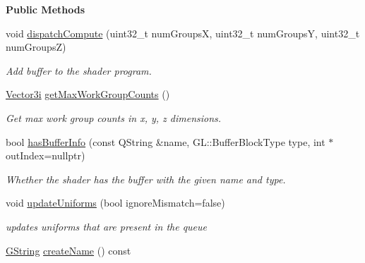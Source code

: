 \begin{Indent}\textbf{ Public Methods}\par
\begin{DoxyCompactItemize}
\item 
void \mbox{\hyperlink{classrev_1_1_shader_program_aa7b7f1acfd59f0fdb168c2643d8654c2}{dispatch\+Compute}} (uint32\+\_\+t num\+GroupsX, uint32\+\_\+t num\+GroupsY, uint32\+\_\+t num\+GroupsZ)
\begin{DoxyCompactList}\small\item\em Add buffer to the shader program. \end{DoxyCompactList}\item 
\mbox{\label{classrev_1_1_shader_program_a93bdc31db991a99df89ce30cd7a11c8b}} 
\mbox{\hyperlink{classrev_1_1_vector}{Vector3i}} \mbox{\hyperlink{classrev_1_1_shader_program_a93bdc31db991a99df89ce30cd7a11c8b}{get\+Max\+Work\+Group\+Counts}} ()
\begin{DoxyCompactList}\small\item\em Get max work group counts in x, y, z dimensions. \end{DoxyCompactList}\item 
\mbox{\label{classrev_1_1_shader_program_a40640813f20216787e159609c274061c}} 
bool \mbox{\hyperlink{classrev_1_1_shader_program_a40640813f20216787e159609c274061c}{has\+Buffer\+Info}} (const Q\+String \&name, G\+L\+::\+Buffer\+Block\+Type type, int $\ast$out\+Index=nullptr)
\begin{DoxyCompactList}\small\item\em Whether the shader has the buffer with the given name and type. \end{DoxyCompactList}\item 
\mbox{\label{classrev_1_1_shader_program_ad48c1c3ccf8fe60f7dd36abde11ee793}} 
void \mbox{\hyperlink{classrev_1_1_shader_program_ad48c1c3ccf8fe60f7dd36abde11ee793}{update\+Uniforms}} (bool ignore\+Mismatch=false)
\begin{DoxyCompactList}\small\item\em updates uniforms that are present in the queue \end{DoxyCompactList}\item 
\mbox{\hyperlink{classrev_1_1_g_string}{G\+String}} \mbox{\hyperlink{classrev_1_1_shader_program_ae594fae38b27c8ee8cc2d78ef418db8c}{create\+Name}} () const

\end{DoxyCompactItemize}
\end{Indent}
